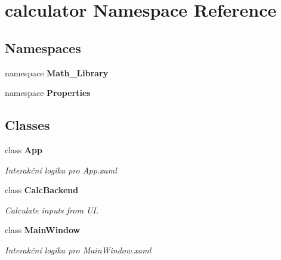\section{calculator Namespace Reference}
\label{namespacecalculator}
\subsection*{Namespaces}
\begin{DoxyCompactItemize}
\item 
namespace \textbf{ Math\+\_\+\+Library}
\item 
namespace \textbf{ Properties}
\end{DoxyCompactItemize}
\subsection*{Classes}
\begin{DoxyCompactItemize}
\item 
class \textbf{ App}
\begin{DoxyCompactList}\small\item\em Interakční logika pro App.\+xaml \end{DoxyCompactList}\item 
class \textbf{ Calc\+Backend}
\begin{DoxyCompactList}\small\item\em Calculate inputs from UI. \end{DoxyCompactList}\item 
class \textbf{ Main\+Window}
\begin{DoxyCompactList}\small\item\em Interakční logika pro Main\+Window.\+xaml \end{DoxyCompactList}\end{DoxyCompactItemize}
